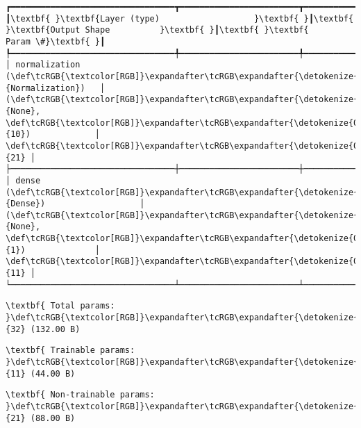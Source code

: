 \documentclass[11pt]{article}
\begin{document}
    \begin{Verbatim}[commandchars=\\\{\}]
┏━━━━━━━━━━━━━━━━━━━━━━━━━━━━━━━━━┳━━━━━━━━━━━━━━━━━━━━━━━━┳━━━━━━━━━━━━━━━┓
┃\textbf{ }\textbf{Layer (type)                   }\textbf{ }┃\textbf{ }\textbf{Output Shape          }\textbf{ }┃\textbf{ }\textbf{      Param \#}\textbf{ }┃
┡━━━━━━━━━━━━━━━━━━━━━━━━━━━━━━━━━╇━━━━━━━━━━━━━━━━━━━━━━━━╇━━━━━━━━━━━━━━━┩
│ normalization (\def\tcRGB{\textcolor[RGB]}\expandafter\tcRGB\expandafter{\detokenize{0,135,255}}{Normalization})   │ (\def\tcRGB{\textcolor[RGB]}\expandafter\tcRGB\expandafter{\detokenize{0,215,255}}{None}, \def\tcRGB{\textcolor[RGB]}\expandafter\tcRGB\expandafter{\detokenize{0,175,0}}{10})             │            \def\tcRGB{\textcolor[RGB]}\expandafter\tcRGB\expandafter{\detokenize{0,175,0}}{21} │
├─────────────────────────────────┼────────────────────────┼───────────────┤
│ dense (\def\tcRGB{\textcolor[RGB]}\expandafter\tcRGB\expandafter{\detokenize{0,135,255}}{Dense})                   │ (\def\tcRGB{\textcolor[RGB]}\expandafter\tcRGB\expandafter{\detokenize{0,215,255}}{None}, \def\tcRGB{\textcolor[RGB]}\expandafter\tcRGB\expandafter{\detokenize{0,175,0}}{1})              │            \def\tcRGB{\textcolor[RGB]}\expandafter\tcRGB\expandafter{\detokenize{0,175,0}}{11} │
└─────────────────────────────────┴────────────────────────┴───────────────┘

    \end{Verbatim}

    
    
    \begin{Verbatim}[commandchars=\\\{\}]
\textbf{ Total params: }\def\tcRGB{\textcolor[RGB]}\expandafter\tcRGB\expandafter{\detokenize{0,175,0}}{32} (132.00 B)

    \end{Verbatim}

    
    
    \begin{Verbatim}[commandchars=\\\{\}]
\textbf{ Trainable params: }\def\tcRGB{\textcolor[RGB]}\expandafter\tcRGB\expandafter{\detokenize{0,175,0}}{11} (44.00 B)

    \end{Verbatim}

    
    
    \begin{Verbatim}[commandchars=\\\{\}]
\textbf{ Non-trainable params: }\def\tcRGB{\textcolor[RGB]}\expandafter\tcRGB\expandafter{\detokenize{0,175,0}}{21} (88.00 B)

    \end{Verbatim}
\end{document}
